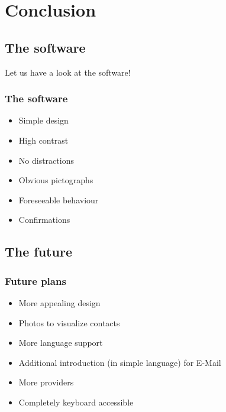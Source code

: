 \documentclass[9pt]{beamer}
\begin{document}
	
	\section{Conclusion}
	
		\subsection{The software}
			\begin{frame}
				\begin{center}
					Let us have a look at the software!
				\end{center}
			\end{frame}
		
			\begin{frame}
				\frametitle{The software}
				\begin{itemize}
					\item Simple design
					\item High contrast
					\item No distractions
					\item Obvious pictographs
					\item Foreseeable behaviour
					\item Confirmations
				\end{itemize}
			
			\end{frame}
		
		\subsection{The future}
			\begin{frame}
				\frametitle{Future plans}
				\begin{itemize}
					\item More appealing design
					\item Photos to visualize contacts
					\item More language support
					\item Additional introduction (in simple language) for E-Mail
					\item More providers
					\item Completely keyboard accessible
				\end{itemize}
			
			\end{frame}
\end{document}
